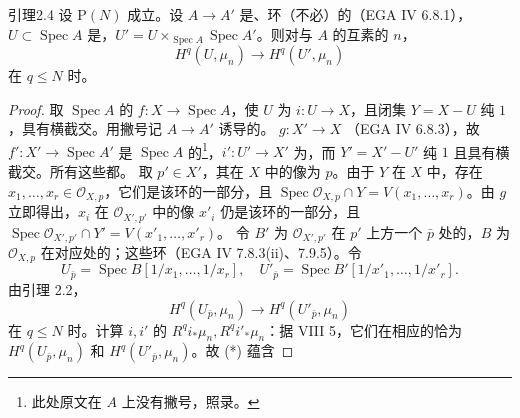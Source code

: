 \begin{SGAresult}{引理}{2.4}
设 $\mathrm P(N)$ 成立。设 $A\to A'$ 是、环（不必）的（EGA IV 6.8.1），$U\subset\operatorname{Spec}A$ 是，$U'=U\times_{\operatorname{Spec}A}\operatorname{Spec}A'$。则对与 $A$ 的互素的 $n$，
\[H^q(U,\mu_n)\longrightarrow H^q(U',\mu_n)\]
在 $q\le N$ 时。
\end{SGAresult}
\begin{proof}
取 $\operatorname{Spec}A$ 的 $f:X\to\operatorname{Spec}A$，使 $U$ 为 $i:U\to X$，且闭集 $Y=X-U$ 纯 $1$，具有横截交。用撇号记 $A\to A'$ 诱导的。 $g:X'\to X$ （EGA IV 6.8.3），故 $f':X'\to\operatorname{Spec}A'$ 是 $\operatorname{Spec}A$ 的\footnote{此处原文在 $A$ 上没有撇号，照录。}，$i':U'\to X'$ 为，而 $Y'=X'-U'$ 纯 $1$ 且具有横截交。所有这些都。
取 $p'\in X'$，其在 $X$ 中的像为 $p$。由于 $Y$ 在 $X$ 中，存在 $x_1,\ldots,x_r\in\mathcal O_{X,p}$，它们是该环的一部分，且 $\operatorname{Spec}\mathcal O_{X,p}\cap Y=V(x_1,\ldots,x_r)$。由 $g$ 立即得出，$x_i$ 在 $\mathcal O_{X',p'}$ 中的像 $x'_i$ 仍是该环的一部分，且 $\operatorname{Spec}\mathcal O_{X',p'}\cap Y'=V(x'_1,\ldots,x'_r)$。
令 $B'$ 为 $\mathcal O_{X',p'}$ 在 $p'$ 上方一个 $\bar p$ 处的，$B$ 为 $\mathcal O_{X,p}$ 在对应处的；这些环（EGA IV 7.8.3(ii)、7.9.5）。令
\[U_{\bar p}=\operatorname{Spec}B[1/x_1,\ldots,1/x_r],\quad U'_{\bar p}=\operatorname{Spec}B'[1/x'_1,\ldots,1/x'_r].\]
由引理 2.2，
\[H^q(U_{\bar p},\mu_n)\longrightarrow H^q(U'_{\bar p},\mu_n)\tag{*}\]
在 $q\le N$ 时。计算 $i,i'$ 的 $R^qi_*\mu_n,R^qi'_*\mu_n$：据 VIII 5，它们在相应的恰为 $H^q(U_{\bar p},\mu_n)$ 和 $H^q(U'_{\bar p},\mu_n)$。故 (*) 蕴含

\end{proof}
